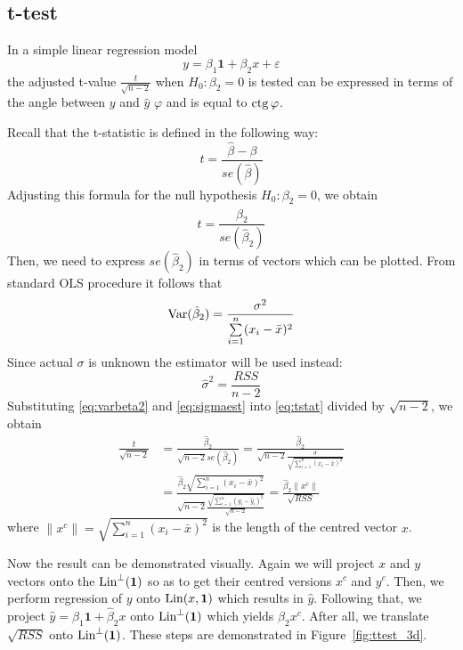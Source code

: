 \subsection{t-test}

In a simple linear regression model
\[
y = \beta_1 \mathbf{1} + \beta_2 x + \varepsilon
\]
the adjusted t-value $\frac{t}{\sqrt{n-2}}$ when $H_0: \beta_2 = 0$ is tested
can be expressed in terms of the angle between $y$ and $\hat y$ $\varphi$ and
is equal to $\operatorname{ctg} \varphi$.

Recall that the t-statistic is defined in the following way:
\[
t = \frac{\hat \beta - \beta}{se\left(\hat\beta\right)}
\]
Adjusting this formula for the null hypothesis $H_0: \beta_2 = 0$, we obtain
\begin{equation}\label{eq:tstat}
t = \frac{\hat \beta_2}{se\left(\hat\beta_2\right)}
\end{equation}
Then, we need to express $se\left(\hat\beta_2\right)$ in terms of vectors which can be
plotted. From standard OLS procedure it follows that
\begin{equation}\label{eq:varbeta2}
\operatorname{Var}(\hat \beta_2) = \frac{\sigma^2}{\sum\limits_{i=1}^n (x_i - \bar x)^2}
\end{equation}
Since actual $\sigma$ is unknown the estimator will be used instead:
\begin{equation}\label{eq:sigmaest}
\hat \sigma^2 = \frac{RSS}{n-2}
\end{equation}
Substituting \eqref{eq:varbeta2} and \eqref{eq:sigmaest} into \eqref{eq:tstat}
divided by $\sqrt{n-2}$, we obtain
\begin{align*}
\frac{t}{\sqrt{n-2}} &=
\frac{\hat \beta_2}{\sqrt{n-2}se\left(\hat\beta_2\right)} =
\frac{\hat \beta_2}{\sqrt{n-2}\frac{\hat \sigma}{\sqrt{\sum\limits_{i=1}^n (x_i - \bar x)^2}}} \\
&= \frac{\hat \beta_2 \sqrt{\sum\limits_{i=1}^n (x_i - \bar x)^2}}{\sqrt{n-2}\frac{\sqrt{\sum\limits_{i=1}^n (y_i - \hat y_i)^2}}{\sqrt{n-2}}} =
\frac{\hat \beta_2 \lVert x^c \rVert}{\sqrt{RSS}}
\end{align*}
where $ \lVert x^c \rVert = \sqrt{\sum_{i=1}^n (x_i - \bar x)^2}$ is the length of the
centred vector $x$.

Now the result can be demonstrated visually.
Again we will project $x$ and $y$ vectors onto the $\operatorname{Lin}^{\perp}(\mathbf{1})$ so as to
get their centred versions $x^c$ and $y^c$.
Then, we perform regression of $y$ onto $\operatorname{Lin}(x, \mathbf{1})$ which results in $\hat y$.
Following that, we project $\hat y = \hat \beta_1 \mathbf{1} + \hat \beta_2 x$ onto $\operatorname{Lin}^{\perp}(\mathbf{1})$
which yields $\hat \beta_2 x^c$.
After all, we translate $\sqrt{RSS}$ onto $\operatorname{Lin}^{\perp}(\mathbf{1})$.
These steps are demonstrated in Figure~\ref{fig:ttest_3d}.


